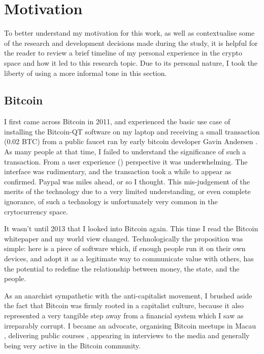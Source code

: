 \section{Motivation}

To better understand my motivation for this work, as well as contextualise some of the research and development decisions made during the study, it is helpful for the reader to review a brief timeline of my personal experience in the crypto space and how it led to this research topic. Due to its personal nature, I took the liberty of using a more informal tone in this section.

\subsection*{Bitcoin}

I first came across Bitcoin in 2011, and experienced the basic use case of installing the Bitcoin-QT software on my laptop and receiving a small transaction (0.02 BTC) from a public faucet ran by early bitcoin developer Gavin Andersen \cite{lucasHowGavinAndresen2022}. As many people at that time, I failed to understand the significance of such a transaction. From a user experience () perspective it was underwhelming.  The interface was rudimentary, and the transaction took a while to appear as confirmed. Paypal was miles ahead, or so I thought. This mis-judgement of the merits of the technology due to a very limited understanding, or even complete ignorance, of such a technology is unfortunately very common in the crytocurrency space.

It wasn't until 2013 that I looked into Bitcoin again. This time I read the Bitcoin whitepaper \cite{nakamotoBitcoinPeertopeerElectronic2008} and my world view changed. Technologically the proposition was simple: here is a piece of software which, if enough people run it on their own devices, and adopt it as a legitimate way to communicate value with others, has the potential to redefine the relationship between money, the state, and the people.

As an anarchist sympathetic with the anti-capitalist movement, I brushed aside the fact that Bitcoin was firmly rooted in a capitalist culture, because it also represented a very tangible step away from a financial system which I saw as irreparably corrupt. I became an advocate, organising Bitcoin meetups in Macau \cite{BitcoinMacau2024}, delivering public courses \cite{mouraUSJHoldCourse2021}, appearing in interviews to the media \cite{tdmportuguesenewsprogramsReportagemJornalistaLina2015} \cite{reisBitcoinDuasFaces2017} and generally being very active in the Bitcoin community.

